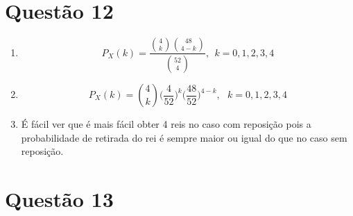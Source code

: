 \documentclass[a4paper,12pt]{report}
\begin{document}
\section{Questão 12}
\begin{enumerate}[label=\alph*)]
	\item 
	$$
	P_X(k)=
	\frac{\binom{4}{k}\binom{48}{4-k} }{\binom{52}{4}}, \ \ k=0,1,2,3,4 $$
	\item 
	$$
	P_X(k)= \binom{4}{k} \bigg(\frac{4}{52}\bigg)^{k}\bigg( \frac{48}{52}\bigg)^{4-k}, \ \ \ k=0,1,2,3,4
	$$
	\item É fácil ver que é mais fácil obter 4 reis no caso com reposição pois a probabilidade de retirada do rei é sempre maior ou igual do que no caso sem reposição.
\end{enumerate}


\newpage
\section{Questão 13}
\end{document}
